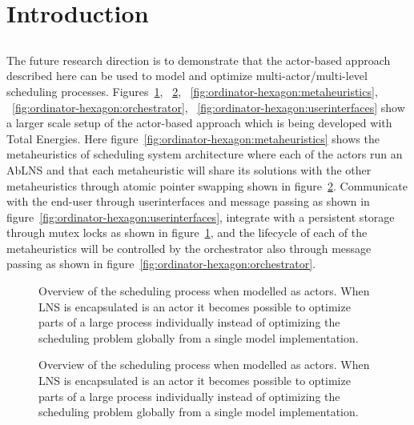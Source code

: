 \section{Introduction}





\subsection{}
The future research direction is to demonstrate that
the actor-based approach described here can be used to model and optimize 
multi-actor/multi-level scheduling processes. 
Figures~\ref{fig:ordinator-hexagon:persistence},
~\ref{fig:ordinator-hexagon:atomicpointerswap},
~\ref{fig:ordinator-hexagon:metaheuristics},
~\ref{fig:ordinator-hexagon:orchestrator},
~\ref{fig:ordinator-hexagon:userinterfaces}
show a larger scale setup of the actor-based approach which is being developed with Total Energies.
Here figure~\ref{fig:ordinator-hexagon:metaheuristics}
shows the metaheuristics of scheduling system architecture where each of the actors run an AbLNS
and that each metaheuristic will share its solutions with the other
metaheuristics through atomic pointer swapping shown in figure~\ref{fig:ordinator-hexagon:atomicpointerswap}.
Communicate with the end-user
through userinterfaces and message passing as shown in figure~\ref{fig:ordinator-hexagon:userinterfaces}, 
integrate with a persistent storage through mutex
locks as shown in figure~\ref{fig:ordinator-hexagon:persistence}, 
and the lifecycle of each of the metaheuristics will be controlled by
the orchestrator also through message passing as shown in figure~\ref{fig:ordinator-hexagon:orchestrator}. 

% 	
\begin{figure}[H]
	\centering
	
	\resizebox{0.7\textwidth}{!}{
		\drawModelSetupHexagon[persistence=true]
	}
	\caption{
		Overview of the scheduling process when modelled as actors. When LNS is encapsulated 
		is an actor it becomes possible to optimize parts of a large process individually instead of 
		optimizing the scheduling problem globally from a single model implementation.
	}\label{fig:ordinator-hexagon:persistence}
\end{figure}
\begin{figure}[H]
	\centering
	
		\drawModelSetupHexagon[atomicpointerswap=true]
	\caption{
		Overview of the scheduling process when modelled as actors. When LNS is encapsulated 
		is an actor it becomes possible to optimize parts of a large process individually instead of 
		optimizing the scheduling problem globally from a single model implementation.
	}
	\label{fig:ordinator-hexagon:atomicpointerswap}
\end{figure}

